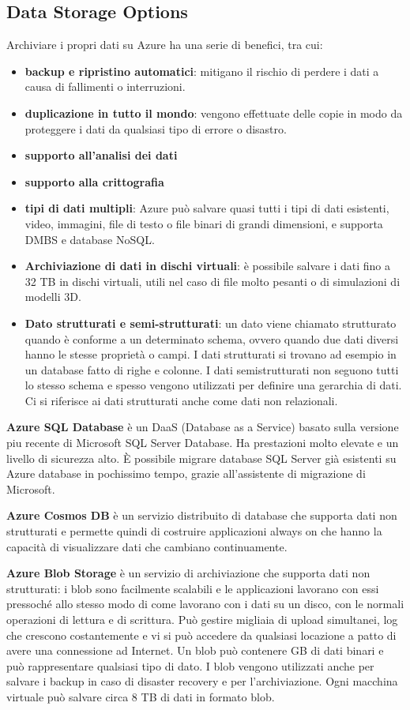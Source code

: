 \subsection{Data Storage Options}
Archiviare i propri dati su Azure ha una serie di benefici, tra cui:
\begin{itemize}
    \item \textbf{backup e ripristino automatici}: mitigano il rischio di perdere i dati a causa di fallimenti o interruzioni.
    \item \textbf{duplicazione in tutto il mondo}: vengono effettuate delle copie in modo da proteggere i dati da qualsiasi tipo di errore o disastro.
    \item \textbf{supporto all'analisi dei dati}
    \item \textbf{supporto alla crittografia}
    \item \textbf{tipi di dati multipli}: Azure può salvare quasi tutti i tipi di dati esistenti, video, immagini, file di testo o file binari di grandi dimensioni, e supporta DMBS e database NoSQL.
    \item \textbf{Archiviazione di dati in dischi virtuali}: è possibile salvare i dati fino a 32 TB in dischi virtuali, utili nel caso di file molto pesanti o di simulazioni di modelli 3D.
    \item \textbf{Dato strutturati e semi-strutturati}: un dato viene chiamato strutturato quando è conforme a un determinato schema, ovvero quando due dati diversi hanno le stesse proprietà o campi. I dati strutturati si trovano ad esempio in un database fatto di righe e colonne. I dati semistrutturati non seguono tutti lo stesso schema e spesso vengono utilizzati per definire una gerarchia di dati. Ci si riferisce ai dati strutturati anche come dati non relazionali.
\end{itemize}
\textbf{Azure SQL Database} è un DaaS (Database as a Service) basato sulla versione piu recente di Microsoft SQL Server Database. Ha prestazioni molto elevate e un livello di sicurezza alto. È possibile migrare database SQL Server già esistenti su Azure database in pochissimo tempo, grazie all'assistente di migrazione di Microsoft.

\textbf{Azure Cosmos DB} è un servizio distribuito di database che supporta dati non strutturati e permette quindi di costruire applicazioni always on che hanno la capacità di visualizzare dati che cambiano continuamente.

\textbf{Azure Blob Storage} è un servizio di archiviazione che supporta dati non strutturati: i blob sono facilmente scalabili e le applicazioni lavorano con essi pressoché allo stesso modo di come lavorano con i dati su un disco, con le normali operazioni di lettura e di scrittura. Può gestire migliaia di upload simultanei, log che crescono costantemente e vi si può accedere da qualsiasi locazione a patto di avere una connessione ad Internet. Un blob può contenere GB di dati binari e può rappresentare qualsiasi tipo di dato. I blob vengono utilizzati anche per salvare i backup in caso di disaster recovery e per l'archiviazione. Ogni macchina virtuale può salvare circa 8 TB di dati in formato blob.

